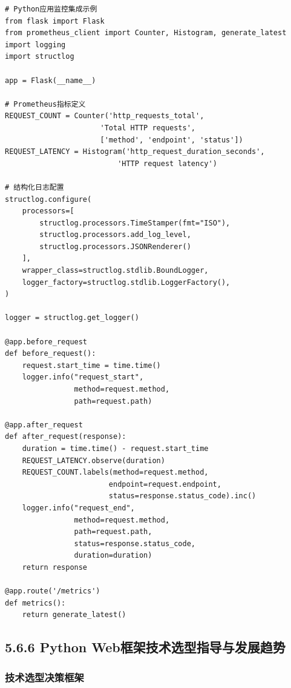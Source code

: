 \begin{lstlisting}[style=python]
# Python应用监控集成示例
from flask import Flask
from prometheus_client import Counter, Histogram, generate_latest
import logging
import structlog

app = Flask(__name__)

# Prometheus指标定义
REQUEST_COUNT = Counter('http_requests_total', 
                      'Total HTTP requests', 
                      ['method', 'endpoint', 'status'])
REQUEST_LATENCY = Histogram('http_request_duration_seconds',
                          'HTTP request latency')

# 结构化日志配置
structlog.configure(
    processors=[
        structlog.processors.TimeStamper(fmt="ISO"),
        structlog.processors.add_log_level,
        structlog.processors.JSONRenderer()
    ],
    wrapper_class=structlog.stdlib.BoundLogger,
    logger_factory=structlog.stdlib.LoggerFactory(),
)

logger = structlog.get_logger()

@app.before_request
def before_request():
    request.start_time = time.time()
    logger.info("request_start", 
                method=request.method, 
                path=request.path)

@app.after_request
def after_request(response):
    duration = time.time() - request.start_time
    REQUEST_LATENCY.observe(duration)
    REQUEST_COUNT.labels(method=request.method,
                        endpoint=request.endpoint,
                        status=response.status_code).inc()
    logger.info("request_end",
                method=request.method,
                path=request.path,
                status=response.status_code,
                duration=duration)
    return response

@app.route('/metrics')
def metrics():
    return generate_latest()
\end{lstlisting}

\hypertarget{python-webux6846ux67b6ux6280ux672fux9009ux578bux6307ux5bfcux4e0eux53d1ux5c55ux8d8bux52bf}{%
\subsection{5.6.6 Python Web框架技术选型指导与发展趋势}\label{python-webux6846ux67b6ux6280ux672fux9009ux578bux6307ux5bfcux4e0eux53d1ux5c55ux8d8bux52bf}}

\hypertarget{ux6280ux672fux9009ux578bux51b3ux7b56ux6846ux67b6}{%
\subsubsection{技术选型决策框架}\label{ux6280ux672fux9009ux578bux51b3ux7b56ux6846ux67b6}}

